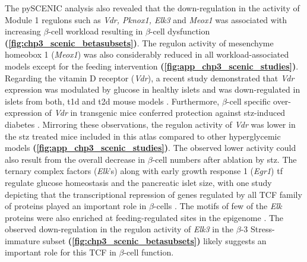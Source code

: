 \par The pySCENIC analysis also revealed that the down-regulation in the activity of Module 1 regulons such as \textit{Vdr, Pknox1, Elk3} and \textit{Meox1} was associated with increasing $\beta$-cell workload resulting in $\beta$-cell dysfunction \textbf{(\autoref{fig:chp3_scenic_betasubsets})}.  The regulon activity of mesenchyme homeobox 1 (\textit{Meox1}) was also considerably reduced in all workload-associated models except for the feeding intervention \textbf{(\autoref{fig:app_chp3_scenic_studies})}. Regarding the vitamin D receptor (\textit{Vdr}), a recent study demonstrated that \textit{Vdr} expression was modulated by glucose in healthy islets and was down-regulated in islets from both, \gls{t1d} and \gls{t2d} mouse models \textbf{\cite{morro_vitamin_2020}}. Furthermore, $\beta$-cell specific over-expression of \textit{Vdr} in transgenic mice conferred protection against \gls{stz}-induced diabetes \textbf{\cite{morro_vitamin_2020}}. Mirroring these observations, the regulon activity of \textit{Vdr} was lower in the \gls{stz} treated mice included in this atlas compared to other hyperglycemic models \textbf{(\autoref{fig:app_chp3_scenic_studies})}. The observed lower activity could also result from the overall decrease in  $\beta$-cell numbers after ablation by \gls{stz}. The ternary complex factors (\textit{Elk}'s) along with early growth response 1 (\textit{Egr1}) \gls{tf} regulate glucose homeostasis and the pancreatic islet size, with one study depicting that the transcriptional repression of genes regulated by all TCF family of proteins played an important role in $\beta$-cells \textbf{\cite{lesch_ternary_2020}}. The motifs of few of the \textit{Elk} proteins were also enriched at feeding-regulated sites in the epigenome \textbf{\cite{wortham_nutrient_2023}}. The observed down-regulation in the regulon activity of \textit{Elk3} in the $\beta$-3 Stress-immature subset \textbf{(\autoref{fig:chp3_scenic_betasubsets})} likely suggests an important role for this TCF in $\beta$-cell function.\\

